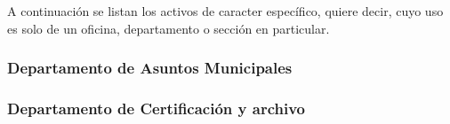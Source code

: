 A continuación se listan los activos de caracter específico, quiere decir, cuyo uso es solo de un oficina, departamento o sección en particular.






\subsubsection{Departamento de Asuntos Municipales}

\subsubsection{Departamento de Certificación y archivo}

